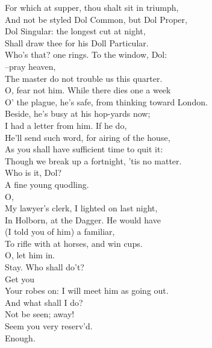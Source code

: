 \documentclass{memoir}
\begin{document}
\begin{drama*}
\facespeaks  For which at supper, thou shalt sit in triumph,\\
 And not be styled Dol Common, but Dol Proper,\\
 Dol Singular: the longest cut at night,\\
 Shall draw thee for his Doll Particular.\\
\subtlespeaks  Who's that? one rings. To the window, Dol:\\
 --pray heaven,\\
 The master do not trouble us this quarter.\\
\facespeaks  O, fear not him. While there dies one a week\\
 O' the plague, he's safe, from thinking toward London.\\
 Beside, he's busy at his hop-yards now;\\
 I had a letter from him. If he do,\\
 He'll send such word, for airing of the house,\\
 As you shall have sufficient time to quit it:\\
 Though we break up a fortnight, 'tis no matter.\\
\subtlespeaks  Who is it, Dol?\\
\dolspeaks {} A fine young quodling.\\
\facespeaks  O,\\
 My lawyer's clerk, I lighted on last night,\\
 In Holborn, at the Dagger. He would have\\
 (I told you of him) a familiar,\\
 To rifle with at horses, and win cups.\\
\dolspeaks  O, let him in.\\
\subtlespeaks {} Stay. Who shall do't?\\
\facespeaks {} Get you\\
 Your robes on: I will meet him as going out.\\
\dolspeaks  And what shall I do?\\
\facespeaks {} Not be seen; away!\\
 Seem you very reserv'd.\\
\subtlespeaks {} Enough.\\

\end{drama*}
\end{document}
